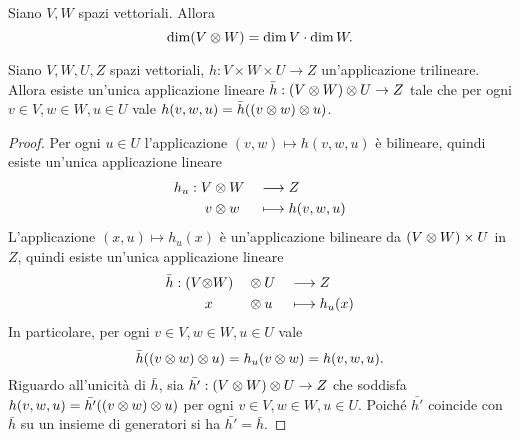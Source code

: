 \begin{corollary}
Siano $V\comma W$ spazi vettoriali. Allora
$$
\dim (V\otimes W)=\dim V\cdot\dim W.
$$
\end{corollary}

\begin{proposition}
Siano $V\comma W\comma U\comma Z$ spazi vettoriali, $h:V\times W\times U\to Z$ un'applicazione trilineare. Allora esiste un'unica applicazione lineare $\bar h:(V\otimes W)\otimes U\to Z$ tale che per ogni $v\in V,w\in W,u\in U$ vale $h(v,w,u)=\bar h((v\otimes w)\otimes u)$.
\end{proposition}
\begin{proof}
Per ogni $u\in U$ l'applicazione $(v,w)\mapsto h(v,w,u)$ è bilineare, quindi esiste un'unica applicazione lineare
\begin{alignat*}{2}
h_u:V&\otimes W&&\longrightarrow Z\\
v&\otimes w&&\longmapsto h(v,w,u)
\end{alignat*}
L'applicazione $(x,u)\mapsto h_u(x)$ è un'applicazione bilineare da $(V\otimes W)\times U$ in $Z$, quindi esiste un'unica applicazione lineare
\begin{alignat*}{3}
\bar h:(V\otimes& W)&&\otimes U&&\longrightarrow Z\\
x&&&\otimes u&&\longmapsto h_u(x)
\end{alignat*}
In particolare, per ogni $v\in V,w\in W,u\in U$ vale
$$
\bar h((v\otimes w)\otimes u)=h_u(v\otimes w)=h(v,w,u).
$$
Riguardo all'unicità di $\bar h$, sia $\bar{h'}:(V\otimes W)\otimes U\to Z$ che soddisfa $h(v,w,u)=\bar{h'}((v\otimes w)\otimes u)$ per ogni $v\in V,w\in W,u\in U$. Poiché $\bar{h'}$ coincide con $\bar h$ su un insieme di generatori si ha $\bar{h'}=\bar h$.
\end{proof}

